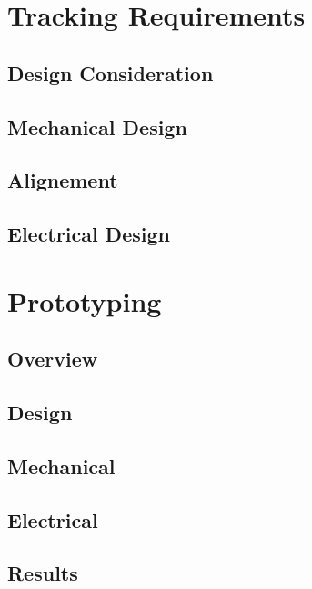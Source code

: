 \section{Tracking Requirements}






\subsection{Design Consideration}

\subsection{Mechanical Design}

\subsection{Alignement}

\subsection{Electrical Design}


\section{Prototyping}

\subsection{Overview}

\subsection{Design}

\subsection{Mechanical}

\subsection{Electrical}

\subsection{Results}

